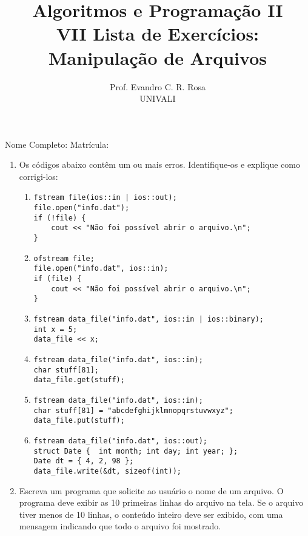 \documentclass[12pt]{article}
\title{Algoritmos e Programação II\\
\large VII Lista de Exercícios: Manipulação de Arquivos}
\author{Prof. Evandro C. R. Rosa\\UNIVALI}
\date{}
\begin{document}
\maketitle

\noindent Nome Completo: \underline{\hspace{8cm}} Matrícula: \underline{\hspace{2.4cm}}

\begin{enumerate}
  \item Os códigos abaixo contêm um ou mais erros. Identifique-os e explique como corrigi-los:
    \begin{enumerate}
      \item
        \begin{verbatim}
fstream file(ios::in | ios::out);
file.open("info.dat");
if (!file) {
    cout << "Não foi possível abrir o arquivo.\n";
}
        \end{verbatim}
      \item
        \begin{verbatim}
ofstream file;
file.open("info.dat", ios::in);
if (file) {
    cout << "Não foi possível abrir o arquivo.\n";
}
        \end{verbatim}
      \item
        \begin{verbatim}
fstream data_file("info.dat", ios::in | ios::binary);
int x = 5;
data_file << x;
        \end{verbatim}
      \item
        \begin{verbatim}
fstream data_file("info.dat", ios::in);
char stuff[81];
data_file.get(stuff);
        \end{verbatim}
      \item
        \begin{verbatim}
fstream data_file("info.dat", ios::in);
char stuff[81] = "abcdefghijklmnopqrstuvwxyz";
data_file.put(stuff);
        \end{verbatim}
      \item
        \begin{verbatim}
fstream data_file("info.dat", ios::out);
struct Date {  int month; int day; int year; };
Date dt = { 4, 2, 98 };
data_file.write(&dt, sizeof(int));
        \end{verbatim}
    \end{enumerate}

  \item Escreva um programa que solicite ao usuário o nome de um arquivo. O programa deve exibir as 10 primeiras linhas do arquivo na tela. Se o arquivo tiver menos de 10 linhas, o conteúdo inteiro deve ser exibido, com uma mensagem indicando que todo o arquivo foi mostrado.


\end{enumerate}
\end{document}
